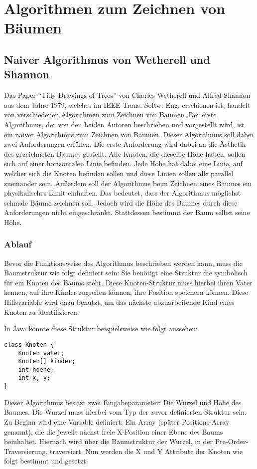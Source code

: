 \chapter{Algorithmen zum Zeichnen von Bäumen}
\label{chap:kapitel3}

\section{Naiver Algorithmus von Wetherell und Shannon}

Das Paper “Tidy Drawings of Trees” von Charles Wetherell und Alfred Shannon aus dem Jahre 1979, 
welches im IEEE Trans. Softw. Eng. erschienen ist, handelt von verschiedenen Algorithmen zum Zeichnen von Bäumen.
Der erste Algorithmus, der von den beiden Autoren beschrieben und vorgestellt wird, ist ein naiver Algorithmus 
zum Zeichnen von Bäumen. Dieser Algorithmus soll dabei zwei Anforderungen erfüllen. Die erste Anforderung wird dabei
an die Ästhetik des gezeichneten Baumes gestellt. Alle Knoten, die dieselbe Höhe haben, sollen sich auf einer horizontalen
Linie befinden. Jede Höhe hat dabei eine Linie, auf welcher sich die Knoten befinden sollen und diese Linien sollen alle
parallel zueinander sein. Außerdem soll der Algorithmus beim Zeichnen eines Baumes ein physikalisches Limit einhalten.
Das bedeutet, dass der Algorithmus möglichst schmale Bäume zeichnen soll. Jedoch wird die Höhe des Baumes durch diese Anforderungen
nicht eingeschränkt. Stattdessen bestimmt der Baum selbst seine Höhe. \cite[]{q1}

\subsection{Ablauf}
Bevor die Funktionsweise des Algorithmus beschrieben werden kann, muss die Baumstruktur wie folgt definiert sein: Sie benötigt eine Struktur die symbolisch für ein Knoten des Baums steht. Diese Knoten-Struktur muss hierbei ihren Vater kennen, auf ihre Kinder zugreifen können, ihre Position speichern können. Diese Hilfsvariable wird dazu benutzt, um das nächste abzuarbeitende Kind eines Knoten zu identifizieren. 

In Java könnte diese Struktur beispielsweise wie folgt aussehen:
\begin{lstlisting}
class Knoten {
	Knoten vater;
	Knoten[] kinder;
	int hoehe;
	int x, y;
}
\end{lstlisting}
Dieser Algorithmus besitzt zwei Eingabeparameter: Die Wurzel und Höhe des Baumes. Die Wurzel muss hierbei vom Typ der zuvor definierten Struktur sein. Zu Beginn wird eine Variable definiert: Ein Array (später Positions-Array genannt), die die jeweils nächst freie X-Position einer Ebene des Baums beinhaltet. Hiernach wird über die Baumstruktur der Wurzel, in der Pre-Order-Traversierung, traversiert. Nun werden die X und Y Attribute der Knoten wie folgt bestimmt und gesetzt:

